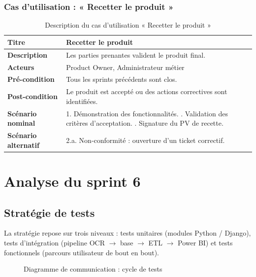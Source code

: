 \subsubsection{Cas d'utilisation : « Recetter le produit »}
\begin{table}[h!]
\centering
\renewcommand{\arraystretch}{1.3}
\begin{tabularx}{\textwidth}{|l|X|}
\hline
\textbf{Titre} & Recetter le produit \\ \hline
\textbf{Description} & Les parties prenantes valident le produit final. \\ \hline
\textbf{Acteurs} & Product Owner, Administrateur métier \\ \hline
\textbf{Pré-condition} & Tous les sprints précédents sont clos. \\ \hline
\textbf{Post-condition} & Le produit est accepté ou des actions correctives sont
identifiées. \\ \hline
\textbf{Scénario nominal} &
1. Démonstration des fonctionnalités. \newline
2. Validation des critères d'acceptation. \newline
3. Signature du PV de recette. \\ \hline
\textbf{Scénario alternatif} &
2.a. Non-conformité : ouverture d'un ticket correctif. \\ \hline
\end{tabularx}
\caption{Description du cas d'utilisation « Recetter le produit »}
\end{table}

\section{Analyse du sprint 6}

\subsection{Stratégie de tests}
La stratégie repose sur trois niveaux : tests unitaires (modules Python / Django),
tests d'intégration (pipeline OCR \(\rightarrow\) base \(\rightarrow\) ETL \(\rightarrow\)
Power BI) et tests fonctionnels (parcours utilisateur de bout en bout).

\begin{figure}[h!]
\centering
{}
\caption{Diagramme de communication : cycle de tests}
\end{figure}

